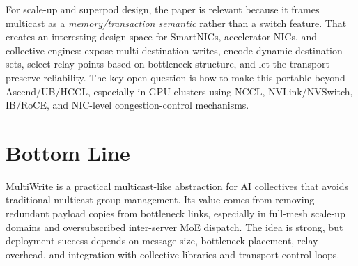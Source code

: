 \documentclass[10pt]{article}
\begin{document}
For scale-up and superpod design, the paper is relevant because it frames multicast as a \emph{memory/transaction semantic} rather than a switch feature. That creates an interesting design space for SmartNICs, accelerator NICs, and collective engines: expose multi-destination writes, encode dynamic destination sets, select relay points based on bottleneck structure, and let the transport preserve reliability. The key open question is how to make this portable beyond Ascend/UB/HCCL, especially in GPU clusters using NCCL, NVLink/NVSwitch, IB/RoCE, and NIC-level congestion-control mechanisms.

\section{Bottom Line}

MultiWrite is a practical multicast-like abstraction for AI collectives that avoids traditional multicast group management. Its value comes from removing redundant payload copies from bottleneck links, especially in full-mesh scale-up domains and oversubscribed inter-server MoE dispatch. The idea is strong, but deployment success depends on message size, bottleneck placement, relay overhead, and integration with collective libraries and transport control loops.
\end{document}
